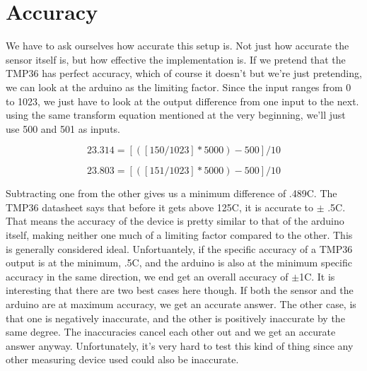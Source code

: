 \documentclass[prb,preprint]{revtex4-1}
\begin{document}
\section{Accuracy}
We have to ask ourselves how accurate this setup is. Not just how accurate the sensor itself is, but how effective the implementation is. If we pretend that the TMP36 has perfect accuracy, which of course it doesn't but we're just pretending, we can look at the arduino as the limiting factor. Since the input ranges from 0 to 1023, we just have to look at the output difference from one input to the next. using the same transform equation mentioned at the very beginning, we'll just use 500 and 501 as inputs.

\begin{equation}
23.314 = [([150/1023] * 5000) - 500] / 10
\end{equation}

\begin{equation}
23.803 = [([151/1023] * 5000) - 500] / 10
\end{equation}

Subtracting one from the other gives us a minimum difference of .489C. The TMP36 datasheet says that before it gets above 125C, it is accurate to $\pm$ .5C. That means the accuracy of the device is pretty similar to that of the arduino itself, making neither one much of a limiting factor compared to the other. This is generally considered ideal. Unfortuantely, if the specific accuracy of a TMP36 output is at the minimum, .5C, and the arduino is also at the minimum specific accuracy in the same direction, we end get an overall accuracy of $\pm$1C. It is interesting that there are two best cases here though. If both the sensor and the arduino are at maximum accuracy, we get an accurate answer. The other case, is that one is negatively inaccurate, and the other is positively inaccurate by the same degree. The inaccuracies cancel each other out and we get an accurate answer anyway. Unfortunately, it's very hard to test this kind of thing since any other measuring device used could also be inaccurate.

\end{document}
